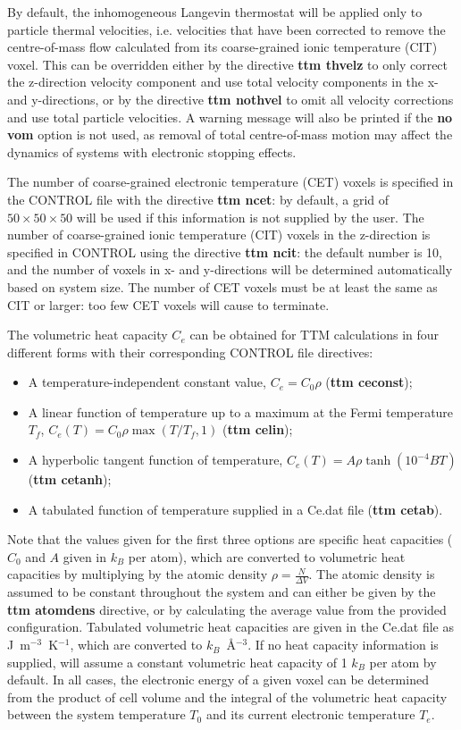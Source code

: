 By default, the inhomogeneous Langevin thermostat will be applied only to 
particle thermal velocities, i.e. velocities that have been corrected to 
remove the centre-of-mass flow calculated from its coarse-grained ionic 
temperature (CIT) voxel. This can be overridden either by the directive 
{\bf ttm thvelz} to only correct the z-direction velocity component and use 
total velocity components in the x- and y-directions, or by the directive 
{\bf ttm nothvel} to omit all velocity corrections and use total particle 
velocities. A warning message will also be printed if the {\bf no vom} option
is not used, as removal of total centre-of-mass motion may affect the 
dynamics of systems with electronic stopping effects.

The number of coarse-grained electronic temperature (CET) voxels is 
specified in the CONTROL file with the directive {\bf ttm ncet}: by default, 
a grid of $50 \times 50 \times 50$ will be used if this information is not 
supplied by the user. The number of coarse-grained ionic temperature (CIT) 
voxels in the z-direction is specified in CONTROL using the directive 
{\bf ttm ncit}: the default number is 10, and the number of voxels in x- 
and y-directions will be determined automatically based on system size. 
The number of CET voxels must be at least the same as CIT or larger: 
too few CET voxels will cause \D to terminate.

The volumetric heat capacity $C_e$ 
can be obtained for TTM calculations in four different forms with their 
corresponding CONTROL file directives: 
\begin{itemize}
\item A temperature-independent constant value, $C_e = C_0 \rho$ ({\bf ttm ceconst});
\item A linear function of temperature up to a maximum at the Fermi temperature $T_{f}$, $C_e (T) = C_0 \rho \max \left(T/T_{f}, 1\right)$ ({\bf ttm celin});
\item A hyperbolic tangent function of temperature, $C_e (T) = A \rho \tanh \left(10^{-4} B T\right)$ ({\bf ttm cetanh});
\item A tabulated function of temperature supplied in a Ce.dat file  ({\bf ttm cetab}).
\end{itemize}
Note that the values given for the first three options are specific heat 
capacities ($C_0$ and $A$ given in $k_B$ per atom), which are 
converted to volumetric heat capacities by multiplying by the atomic 
density $\rho = \frac{N}{\Delta V}$. The atomic density is assumed to 
be constant throughout the system and can either be given by the 
{\bf ttm atomdens} directive, or by calculating the average value from 
the provided configuration. Tabulated volumetric heat capacities are given 
in the Ce.dat file as J~m$^{-3}$~K$^{-1}$, which are converted to 
$k_B$~\AA$^{-3}$. If no heat capacity information is supplied, \D will 
assume a constant volumetric heat capacity of 1 $k_B$ per atom by 
default. In all cases, the electronic energy of a given voxel can be 
determined from the product of cell volume and the integral of the 
volumetric heat capacity between the system temperature $T_0$ 
and its current electronic temperature $T_e$.

